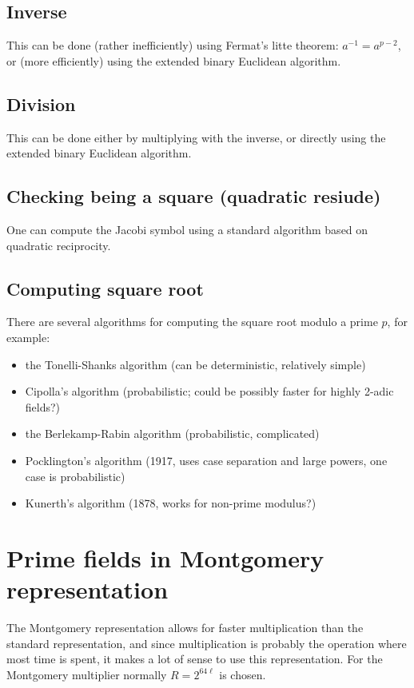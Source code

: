 \documentclass[12pt,draft,a4paper,openany,oneside]{amsbook}
\theoremstyle{plain}
\theoremstyle{definition}
\begin{document}
\subsection{Inverse}
This can be done (rather inefficiently) using Fermat's litte theorem:
$a^{-1} = a^{p-2}$, or (more efficiently) using the extended binary 
Euclidean algorithm.

\subsection{Division}
This can be done either by multiplying with the inverse, or directly using
the extended binary Euclidean algorithm.

\subsection{Checking being a square (quadratic resiude)}
One can compute the Jacobi symbol using a standard algorithm based
on quadratic reciprocity.

\subsection{Computing square root}
There are several algorithms for computing the square root modulo a prime $p$, for example:
\begin{itemize}
\item the Tonelli-Shanks algorithm (can be deterministic, relatively simple)
\item Cipolla's algorithm (probabilistic; could be possibly faster for highly 2-adic fields?)
\item the Berlekamp-Rabin algorithm (probabilistic, complicated)
\item Pocklington's algorithm (1917, uses case separation and large powers, one case is probabilistic)
\item Kunerth's algorithm (1878, works for non-prime modulus?)
\end{itemize}


\section{Prime fields in Montgomery representation}

The Montgomery representation allows for faster multiplication than the standard
representation, and since multiplication is probably the operation where most
time is spent, it makes a lot of sense to use this representation. For the 
Montgomery multiplier normally $R=2^{64\ell}$ is chosen.\\
\end{document}
